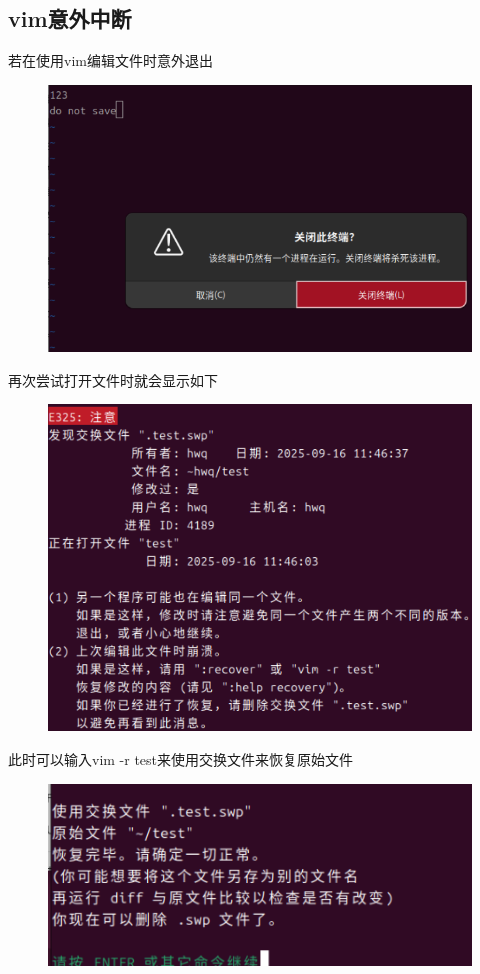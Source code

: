 \documentclass[a4paper, 12pt]{article}
\begin{document}
\subsection{vim意外中断}
若在使用vim编辑文件时意外退出
\begin{figure}[H]
    \centering
    \includegraphics[width=1\linewidth]{vim8.png}
\end{figure}
再次尝试打开文件时就会显示如下
\begin{figure}[H]
    \centering
    \includegraphics[width=1\linewidth]{vim9.png}
\end{figure}
此时可以输入vim -r test来使用交换文件来恢复原始文件
\begin{figure}[H]
    \centering
    \includegraphics[width=1\linewidth]{vim10.png}
\end{figure}
\end{document}
